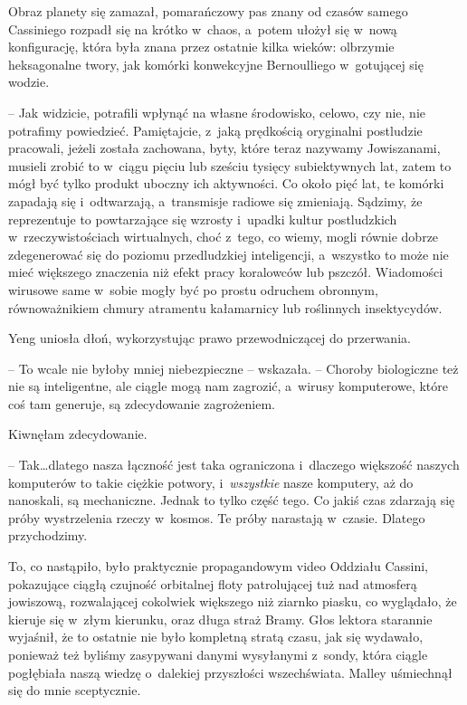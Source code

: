 \documentclass[oneside,polish,11pt,sfheadings]{mwbk}
\begin{document}
Obraz planety się zamazał, pomarańczowy pas znany od czasów samego
Cassiniego rozpadł się na krótko w~chaos, a~potem ułożył się w~nową
konfigurację, która była znana przez ostatnie kilka wieków: olbrzymie
heksagonalne twory, jak komórki konwekcyjne Bernoulliego w~gotującej się
wodzie.

-- Jak widzicie, potrafili wpłynąć na własne środowisko, celowo, czy nie,
nie potrafimy powiedzieć. Pamiętajcie, z~jaką prędkością oryginalni
postludzie pracowali, jeżeli została zachowana, byty, które teraz
nazywamy Jowiszanami, musieli zrobić to w~ciągu pięciu lub sześciu
tysięcy subiektywnych lat, zatem to mógł być tylko produkt uboczny ich
aktywności. Co około pięć lat, te komórki zapadają się i~odtwarzają, a~transmisje radiowe się zmieniają. Sądzimy, że reprezentuje to
powtarzające się wzrosty i~upadki kultur postludzkich w~rzeczywistościach wirtualnych, choć z~tego, co wiemy, mogli równie
dobrze zdegenerować się do poziomu przedludzkiej inteligencji, a~wszystko to może nie mieć większego znaczenia niż efekt pracy koralowców
lub pszczół. Wiadomości wirusowe same w~sobie mogły być po prostu
odruchem obronnym, równoważnikiem chmury atramentu kałamarnicy lub
roślinnych insektycydów.

Yeng uniosła dłoń, wykorzystując prawo przewodniczącej do przerwania. 

-- To wcale nie byłoby mniej niebezpieczne -- wskazała. -- Choroby
biologiczne też nie są inteligentne, ale ciągle mogą nam zagrozić, a~wirusy komputerowe, które coś tam generuje, są zdecydowanie zagrożeniem.

Kiwnęłam zdecydowanie. 

-- Tak\ldots  dlatego nasza łączność jest taka
ograniczona i~dlaczego większość naszych komputerów to takie ciężkie
potwory, i~\textit{wszystkie} nasze komputery, aż do nanoskali, są
mechaniczne. Jednak to tylko część tego. Co jakiś czas zdarzają się
próby wystrzelenia rzeczy w~kosmos. Te próby narastają w~czasie. Dlatego
przychodzimy.

To, co nastąpiło, było praktycznie propagandowym video Oddziału Cassini,
pokazujące ciągłą czujność orbitalnej floty patrolującej tuż nad
atmosferą jowiszową, rozwalającej cokolwiek większego niż ziarnko
piasku, co wyglądało, że kieruje się w~złym kierunku, oraz długa straż
Bramy. Głos lektora starannie wyjaśnił, że to ostatnie nie było
kompletną stratą czasu, jak się wydawało, ponieważ też byliśmy
zasypywani danymi wysyłanymi z~sondy, która ciągle pogłębiała naszą
wiedzę o~dalekiej przyszłości wszechświata. Malley uśmiechnął się do
mnie sceptycznie.
\end{document}
